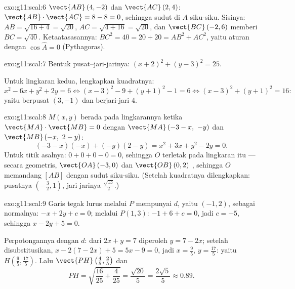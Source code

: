 \begin{solution}{exo:g11:scal:6}
$\vect{AB}\,(4, -2)$ dan $\vect{AC}\,(2, 4)$:
$\vect{AB}\cdot\vect{AC} = 8 - 8 = 0$, sehingga sudut di $A$ siku-siku.
Sisinya: $AB = \sqrt{16 + 4} = \sqrt{20}$, $AC = \sqrt{4 + 16} =
\sqrt{20}$, dan $\vect{BC}\,(-2, 6)$ memberi $BC = \sqrt{40}$. Ketaatasasannya:
$BC^2 = 40 = 20 + 20 = AB^2 + AC^2$, yaitu aturan  dengan
$\cos\widehat A = 0$ (Pythagoras).
\end{solution}

\begin{solution}{exo:g11:scal:7}
Bentuk pusat--jari-jarinya: $(x + 2)^2 + (y - 3)^2 = 25$.

Untuk lingkaran kedua, lengkapkan kuadratnya:
\[
x^2 - 6x + y^2 + 2y = 6
\iff (x - 3)^2 - 9 + (y + 1)^2 - 1 = 6
\iff (x-3)^2 + (y+1)^2 = 16 :
\]
yaitu berpusat $(3, -1)$ dan berjari-jari $4$.
\end{solution}

\begin{solution}{exo:g11:scal:8}
$M(x,y)$ berada pada lingkarannya ketika $\vect{MA}\cdot\vect{MB} = 0$ dengan
$\vect{MA}\,(-3 - x,\ -y)$ dan $\vect{MB}\,(-x,\ 2 - y)$:
\[
(-3 - x)(-x) + (-y)(2 - y) = x^2 + 3x + y^2 - 2y = 0 .
\]
Untuk titik asalnya: $0 + 0 + 0 - 0 = 0$, sehingga $O$ terletak pada lingkaran
itu --- secara geometris, $\vect{OA}\,(-3,0)$ dan $\vect{OB}\,(0,2)$ ,
sehingga $O$ memandang $[AB]$ dengan sudut siku-siku. (Setelah kuadratnya
dilengkapkan: pusatnya $\left(-\frac32, 1\right)$, jari-jarinya $\frac{\sqrt{13}}{2}$.)
\end{solution}

\begin{solution}{exo:g11:scal:9}
Garis tegak lurus melalui $P$ mempunyai  $d$, yaitu
$(-1, 2)$, sebagai  normalnya:  $-x + 2y + c = 0$; melalui
$P(1,3)$: $-1 + 6 + c = 0$, jadi $c = -5$, sehingga $x - 2y + 5 = 0$.

Perpotongannya dengan $d$: dari $2x + y = 7$ diperoleh $y = 7 - 2x$; setelah
disubstitusikan, $x - 2(7 - 2x) + 5 = 5x - 9 = 0$, jadi $x = \frac95$,
$y = \frac{17}5$: yaitu $H\left(\frac95, \frac{17}5\right)$. Lalu
$\vect{PH}\left(\frac45, \frac25\right)$ dan
\[
PH = \sqrt{\frac{16}{25} + \frac{4}{25}} = \frac{\sqrt{20}}{5}
= \frac{2\sqrt5}{5} \approx 0.89 .
\]
\end{solution}

